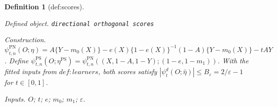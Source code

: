 \documentclass{article}
\newtheorem{definition}{Definition}
\begin{document}
\begin{definition}[def:scores]\label{def:scores}
\par\smallskip\noindent\emph{Defined object.} \texttt{directional orthogonal scores}
\par\smallskip\noindent\emph{Construction.} \(\psi_{t,n}^{\mathrm{PN}}(O;\eta)=A\{Y-m_0(X)\}-e(X)\{1-e(X)\}^{-1}(1-A)\{Y-m_0(X)\}-tAY\). Define \(\psi_{t,n}^{\mathrm{PS}}(O;\eta^{\mathrm{PS}})=\psi_{t,n}^{\mathrm{PN}}((X,1-A,1-Y);(1-e,1-m_1))\). With the fitted inputs from \(def:learners\), both scores satisfy \( |\psi_t^d(O;\widehat\eta)|\le B_\varepsilon=2/\varepsilon-1\) for \(t\in[0,1]\).
\par\smallskip\noindent\emph{Inputs.} \(O\); \(t\); \(e\); \(m_0\); \(m_1\); \(\varepsilon\).
\end{definition}
\end{document}
